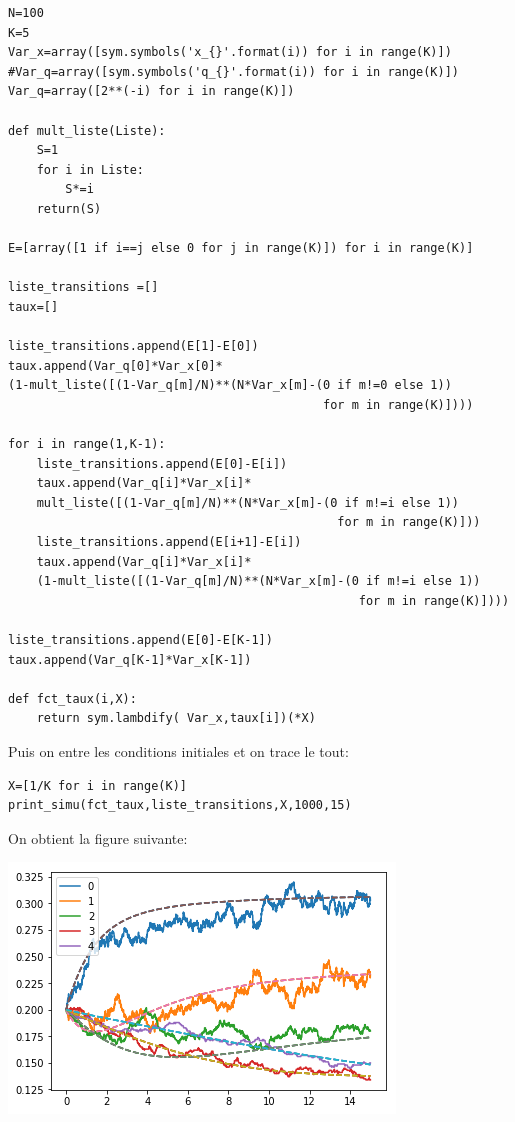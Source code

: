 \documentclass[a4paper]{article}
\begin{document}
\newpage
\begin{lstlisting}[frame=single]
N=100
K=5
Var_x=array([sym.symbols('x_{}'.format(i)) for i in range(K)])
#Var_q=array([sym.symbols('q_{}'.format(i)) for i in range(K)])
Var_q=array([2**(-i) for i in range(K)])

def mult_liste(Liste):
    S=1
    for i in Liste:
        S*=i
    return(S)

E=[array([1 if i==j else 0 for j in range(K)]) for i in range(K)]

liste_transitions =[]
taux=[]

liste_transitions.append(E[1]-E[0])
taux.append(Var_q[0]*Var_x[0]*
(1-mult_liste([(1-Var_q[m]/N)**(N*Var_x[m]-(0 if m!=0 else 1)) 
                                            for m in range(K)])))

for i in range(1,K-1):
    liste_transitions.append(E[0]-E[i])
    taux.append(Var_q[i]*Var_x[i]*
    mult_liste([(1-Var_q[m]/N)**(N*Var_x[m]-(0 if m!=i else 1)) 
                                              for m in range(K)]))
    liste_transitions.append(E[i+1]-E[i])
    taux.append(Var_q[i]*Var_x[i]*
    (1-mult_liste([(1-Var_q[m]/N)**(N*Var_x[m]-(0 if m!=i else 1)) 
                                                 for m in range(K)])))

liste_transitions.append(E[0]-E[K-1])
taux.append(Var_q[K-1]*Var_x[K-1])

def fct_taux(i,X):
    return sym.lambdify( Var_x,taux[i])(*X)
\end{lstlisting}

Puis on entre les conditions initiales et on trace le tout:

\begin{lstlisting}[frame=single]
X=[1/K for i in range(K)]
print_simu(fct_taux,liste_transitions,X,1000,15)
\end{lstlisting}

On obtient la figure suivante:

\includegraphics{bianchi.png}
\end{document}
